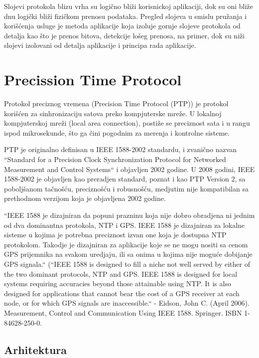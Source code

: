 \documentclass[a4paper,12pt, master]{etf}
\begin{document}
	Slojevi protokola blizu vrha su logi\v{c}no bli\v{z}i korisnickoj aplikaciji, dok su oni bli\v{z}e dnu 
	logi\v{c}ki bli\v{z}i fizi\v{c}kom prenosu podataka. Pregled slojeva u smislu pru\v{z}anja i kori\v{s}\'{c}enja 
	usluge je metoda aplikacije koja izoluje gornje slojeve protokola od detalja kao \v{s}to je 
	prenos bitova, detekcije lo\v{s}eg prenosa, na primer, dok su ni\v{z}i slojevi izolovani od detalja 
	aplikacije i principa rada aplikacije.

	\section{Precission Time Protocol}
    
	Protokol preciznog vremena (Precision Time Protocol (PTP)) je protokol
	kori\v{s}\'{c}en za sinhronizaciju satova preko kompjuterske mre\v{z}e. U lokalnoj
	kompjuterskoj mre\v{z}i (local area connection), posti\v{z}e se preciznost sata i u rangu
	ispod mikrosekunde, \v{s}to ga \v{c}ini pogodnim za merenja i kontrolne sisteme.

	PTP je originalno definisan u IEEE 1588-2002 standardu, i zvani\v{c}no nazvan
	``Standard for a Precision Clock Synchronization Protocol for Networked Measurement
	and Control Systems`` i objavljen 2002 godine. U 2008 godini, IEEE 1588-2002 je
    objavljen kao preradjen standard, poznat i kao PTP Version 2, sa pobolj\v{s}anom 
    ta\v{c}no\v{s}\'{c}u, precizno\v{s}\'{c}u i robusno\v{s}\'{c}u, medjutim nije kompatibilan 
    sa prethodnom verzijom koja je objavljena 2002 godine.

	``IEEE 1588 je dizajniran da popuni prazninu koja nije dobro obradjena ni jednim od dva
	dominantna protokola, NTP i GPS. IEEE 1588 je dizajniran za lokalne sisteme u kojima je
	potrebna preciznost izvan one koja je dostupna NTP protokolom. Takodje je dizajniran za
	aplikacije koje se ne mogu nositi sa cenom GPS prijemnika na svakom uredjaju, ili sa onima 
    u kojima nije mogu\'{c}e dobijanje GPS signala.`` (``IEEE 1588 is designed to fill a niche 
    not well served by either of the two dominant protocols, NTP and GPS. IEEE 1588 is designed 
    for local systems requiring accuracies beyond those attainable using NTP. It is also designed 
    for applications that cannot bear the cost of a GPS receiver at each node, or for which GPS 
    signals are inaccessible.`` - Eidson, John C. (April 2006). Measurement, Control and 
    Communication Using IEEE 1588. Springer. ISBN 1-84628-250-0.

    \subsection{Arhitektura}
    
\end{document}
